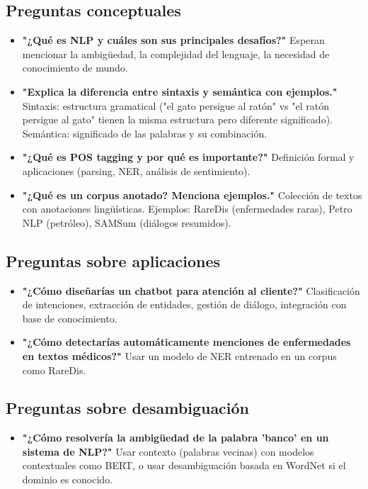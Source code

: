 \documentclass[12pt,a4paper,openany,oneside]{book}
\begin{document}
\subsection{Preguntas conceptuales}
\begin{itemize}
    \item \textbf{"¿Qué es NLP y cuáles son sus principales desafíos?"}
    Esperan mencionar la ambigüedad, la complejidad del lenguaje, la necesidad de conocimiento de mundo.
    \item \textbf{"Explica la diferencia entre sintaxis y semántica con ejemplos."}
    Sintaxis: estructura gramatical ("el gato persigue al ratón" vs "el ratón persigue al gato" tienen la misma estructura pero diferente significado). Semántica: significado de las palabras y su combinación.
    \item \textbf{"¿Qué es POS tagging y por qué es importante?"}
    Definición formal y aplicaciones (parsing, NER, análisis de sentimiento).
    \item \textbf{"¿Qué es un corpus anotado? Menciona ejemplos."}
    Colección de textos con anotaciones lingüísticas. Ejemplos: RareDis (enfermedades raras), Petro NLP (petróleo), SAMSum (diálogos resumidos).
\end{itemize}

\subsection{Preguntas sobre aplicaciones}
\begin{itemize}
    \item \textbf{"¿Cómo diseñarías un chatbot para atención al cliente?"}
    Clasificación de intenciones, extracción de entidades, gestión de diálogo, integración con base de conocimiento.
    \item \textbf{"¿Cómo detectarías automáticamente menciones de enfermedades en textos médicos?"}
    Usar un modelo de NER entrenado en un corpus como RareDis.
\end{itemize}

\subsection{Preguntas sobre desambiguación}
\begin{itemize}
    \item \textbf{"¿Cómo resolvería la ambigüedad de la palabra 'banco' en un sistema de NLP?"}
    Usar contexto (palabras vecinas) con modelos contextuales como BERT, o usar desambiguación basada en WordNet si el dominio es conocido.
\end{itemize}
\end{document}
